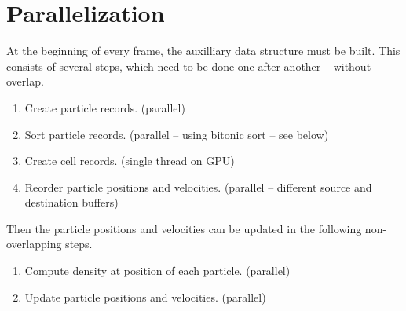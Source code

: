 \documentclass[a4paper,report]{IEEEtran}
\newcounter{kernelCounter}
\begin{document}
\section{Parallelization}
\label{sec:parallelization}
At the beginning of every frame, the auxilliary data structure must be built. This consists of several steps, which need to be done one after another -- without overlap.
\begin{enumerate}
	\item Create particle records. (parallel)
	\item Sort particle records. (parallel -- using bitonic sort -- see below)
	\item Create cell records. (single thread on GPU)
	\item Reorder particle positions and velocities. (parallel -- different source and destination buffers)
	\setcounter{kernelCounter}{\value{enumi}}
\end{enumerate}
Then the particle positions and velocities can be updated in the following non-overlapping steps.
\begin{enumerate}
	\setcounter{enumi}{\value{kernelCounter}}
	\item Compute density at position of each particle. (parallel)
	\item Update particle positions and velocities. (parallel)
\end{enumerate}
\end{document}
